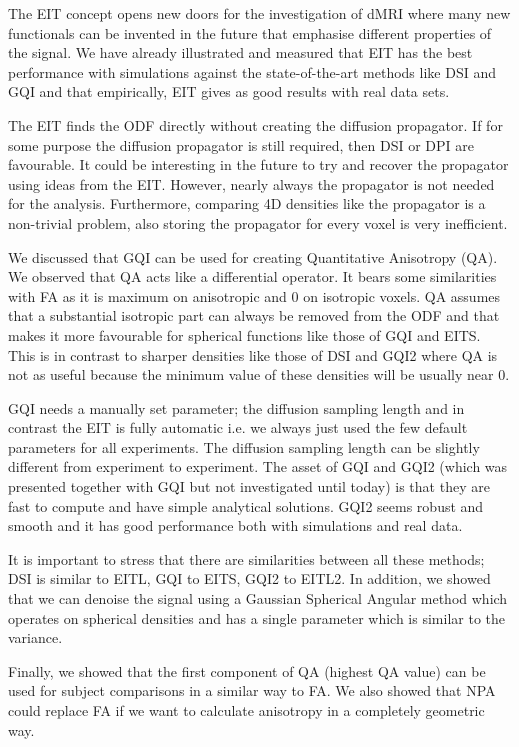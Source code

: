 \documentclass{bioinfo}
\begin{document}
The EIT concept opens new doors for the investigation of dMRI where
many new functionals can be invented in the future that emphasise
different properties of the signal. We have already illustrated and
measured that EIT has the best performance with simulations against
the state-of-the-art methods like DSI and GQI and that empirically,
EIT gives as good results with real data sets.

The EIT finds the ODF directly without creating the diffusion propagator.
If for some purpose the diffusion propagator is still required, then
DSI or DPI \citep{descoteaux2010multiple} are favourable. It could
be interesting in the future to try and recover the propagator using
ideas from the EIT. However, nearly always the propagator is not needed
for the analysis. Furthermore, comparing 4D densities like the propagator
is a non-trivial problem, also storing the propagator for every voxel
is very inefficient.

We discussed that GQI can be used for creating Quantitative Anisotropy
(QA). We observed that QA acts like a differential operator. It bears
some similarities with FA as it is maximum on anisotropic and $0$
on isotropic voxels. QA assumes that a substantial isotropic part
can always be removed from the ODF and that makes it more favourable
for spherical functions like those of GQI and EITS. This is in contrast
to sharper densities like those of DSI and GQI2 where QA is not as
useful because the minimum value of these densities will be usually
near $0$. 

GQI needs a manually set parameter; the diffusion sampling length
and in contrast the EIT is fully automatic i.e. we always just used
the few default parameters for all experiments. The diffusion sampling
length can be slightly different from experiment to experiment. The
asset of GQI and GQI2 (which was presented together with GQI but not
investigated until today) is that they are fast to compute and have
simple analytical solutions. GQI2 seems robust and smooth and it has
good performance both with simulations and real data. 

It is important to stress that there are similarities between all
these methods; DSI is similar to EITL, GQI to EITS, GQI2 to EITL2.
In addition, we showed that we can denoise the signal using a Gaussian
Spherical Angular method which operates on spherical densities and
has a single parameter which is similar to the variance.

Finally, we showed that the first component of QA (highest QA value)
can be used for subject comparisons in a similar way to FA. We also
showed that NPA could replace FA if we want to calculate anisotropy
in a completely geometric way. 
\end{document}
